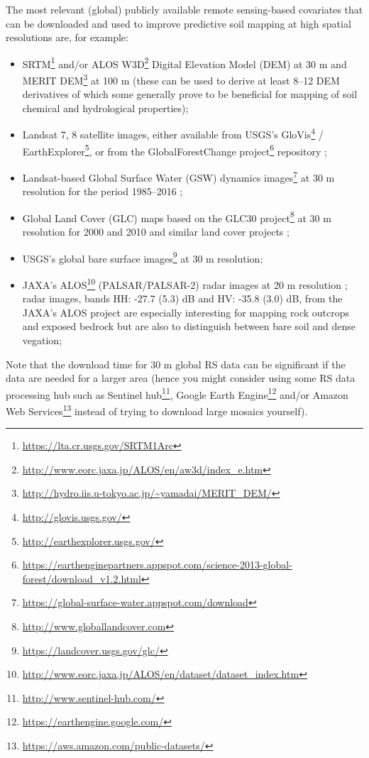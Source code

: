 \documentclass[11pt]{krantz}
\renewcommand{\href}[2]{#2\footnote{\url{#1}}}
\theoremstyle{definition}
\theoremstyle{definition}
\theoremstyle{definition}
\theoremstyle{remark}
\begin{document}
The most relevant (global) publicly available remote sensing-based
covariates that can be downloaded and used to improve predictive soil
mapping at high spatial resolutions are, for example:

\begin{itemize}
\item
  \href{https://lta.cr.usgs.gov/SRTM1Arc}{SRTM} and/or
  \href{http://www.eorc.jaxa.jp/ALOS/en/aw3d/index_e.htm}{ALOS W3D}
  Digital Elevation Model (DEM) at 30 m and
  \href{http://hydro.iis.u-tokyo.ac.jp/~yamadai/MERIT_DEM/}{MERIT DEM}
  at 100 m (these can be used to derive at least 8--12 DEM derivatives
  of which some generally prove to be beneficial for mapping of soil
  chemical and hydrological properties);
\item
  Landsat 7, 8 satellite images, either available from USGS's
  \href{http://glovis.usgs.gov/}{GloVis} /
  \href{http://earthexplorer.usgs.gov/}{EarthExplorer}, or from the
  \href{https://earthenginepartners.appspot.com/science-2013-global-forest/download_v1.2.html}{GlobalForestChange
  project} repository \citep{hansen2013high};
\item
  \href{https://global-surface-water.appspot.com/download}{Landsat-based
  Global Surface Water (GSW) dynamics images} at 30 m resolution for the
  period 1985--2016 \citep{pekel2016high};
\item
  Global Land Cover (GLC) maps based on the
  \href{http://www.globallandcover.com}{GLC30 project} at 30 m
  resolution for 2000 and 2010 \citep{Chen2014} and similar land cover
  projects \citep{Herold2016};
\item
  USGS's \href{https://landcover.usgs.gov/glc/}{global bare surface
  images} at 30 m resolution;
\item
  \href{http://www.eorc.jaxa.jp/ALOS/en/dataset/dataset_index.htm}{JAXA's
  ALOS} (PALSAR/PALSAR-2) radar images at 20 m resolution
  \citep{shimada2014new}; radar images, bands HH: -27.7 (5.3) dB and HV:
  -35.8 (3.0) dB, from the JAXA's ALOS project are especially
  interesting for mapping rock outcrops and exposed bedrock but are also
  to distinguish between bare soil and dense vegation;
\end{itemize}

Note that the download time for 30 m global RS data can be significant
if the data are needed for a larger area (hence you might consider using
some RS data processing hub such as
\href{http://www.sentinel-hub.com/}{Sentinel hub},
\href{https://earthengine.google.com/}{Google Earth Engine} and/or
\href{https://aws.amazon.com/public-datasets/}{Amazon Web Services}
instead of trying to download large mosaics yourself).
\end{document}
